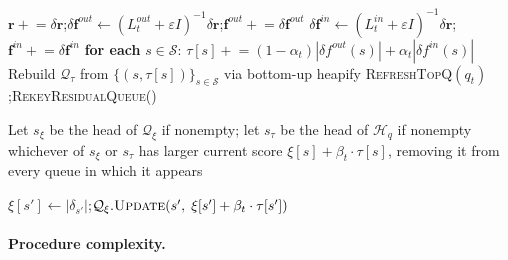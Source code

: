 \documentclass[10pt,a4paper]{article}
\begin{document}
\begin{algorithm}[!h]
\begin{algorithmic}[1]
\Statex
{} 
  \State $\mathbf{r} \mathrel{+}= \delta\mathbf{r}$;\quad $\delta\mathbf{f}^{out} \gets (L^{out}_t+\varepsilon I)^{-1}\delta\mathbf{r}$;\quad $\mathbf{f}^{out} \mathrel{+}= \delta\mathbf{f}^{out}$
  \State $\delta\mathbf{f}^{in} \gets (L^{in}_t+\varepsilon I)^{-1}\delta\mathbf{r}$;\quad $\mathbf{f}^{in} \mathrel{+}= \delta\mathbf{f}^{in}$
  \State \textbf{for each} $s \in \mathcal{S}$: $\tau[s] \mathrel{+}= (1-\alpha_t)|\delta f^{out}(s)| + \alpha_t|\delta f^{in}(s)|$ 
  \State Rebuild $\mathcal{Q}_{\tau}$ from $\{(s,\tau[s])\}_{s\in\mathcal{S}}$ via bottom-up heapify
  \State \textsc{RefreshTopQ}$(q_t)$;\quad \textsc{RekeyResidualQueue}()
\EndProcedure

\Statex
{} 
  \State Let $s_{\xi}$ be the head of $\mathcal{Q}_{\xi}$ if nonempty; let $s_{\tau}$ be the head of $\mathcal{H}_q$ if nonempty
  \State \Return whichever of $s_{\xi}$ or $s_{\tau}$ has larger current score $\xi[s]+\beta_t\cdot\tau[s]$, removing it from every queue in which it appears
\EndProcedure

\Statex
{} 
    \State $\xi[s'] \gets |\delta_{s'}|$;\quad $\mathcal{Q}_{\xi}.\textsc{Update}(s',\; \xi[s']+\beta_t\cdot\tau[s'])$ 
  \EndFor
\EndProcedure

\end{algorithmic}
\end{algorithm}


\paragraph{Procedure complexity.}
\end{document}
